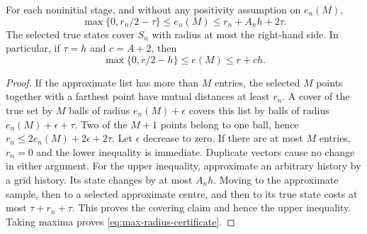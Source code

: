 \begin{lemma}\label{lem:radius-certificate}
For each noninitial stage, and without any positivity assumption on
$e_n(M)$,
\begin{equation}\label{eq:radius-certificate}
 \max\{0,r_n/2-\tau\}\le e_n(M)
                   \le r_n+A_nh+2\tau.
\end{equation}
The selected true states cover $S_n$ with radius at most the right-hand
side. In particular, if $\tau=h$ and $c=A+2$, then
\begin{equation}\label{eq:max-radius-certificate}
 \max\{0,r/2-h\}\le e(M)\le r+ch.
\end{equation}
\end{lemma}
\begin{proof}
If the approximate list has more than $M$ entries, the selected $M$
points together with a farthest point have mutual distances at least
$r_n$. A cover of the true set by $M$ balls of radius $e_n(M)+\epsilon$
covers this list by balls of radius $e_n(M)+\epsilon+\tau$.
Two of the $M+1$ points belong to one ball, hence
$r_n\le2e_n(M)+2\epsilon+2\tau$. Let $\epsilon$ decrease to zero.
If there are at most $M$ entries, $r_n=0$ and the lower inequality is
immediate. Duplicate vectors cause no change in either argument.
For the upper inequality, approximate an arbitrary history by a grid
history. Its state changes by at most $A_nh$. Moving to the approximate
sample, then to a selected approximate centre, and then to its true
state costs at most $\tau+r_n+\tau$. This proves the covering claim
and hence the upper inequality. Taking maxima proves
\eqref{eq:max-radius-certificate}.
\end{proof}

